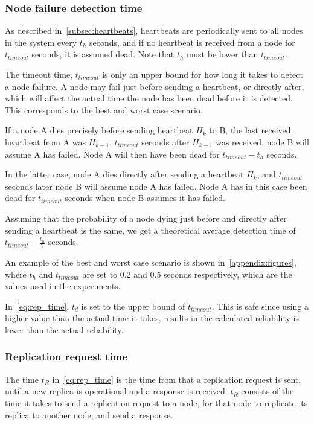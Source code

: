 \documentclass{cslthse-msc}
\begin{document}
\subsubsection{Node failure detection time} \label{sec:node_failure_detection_time}
As described in~\cref{subsec:heartbeats}, heartbeats are periodically sent to all nodes in the system every $t_h$ seconds, and if no heartbeat is received from a node for $t_{timeout}$ seconds, it is assumed dead. Note that $t_h$ must be lower than $t_{timeout}$.

The timeout time, $t_{timeout}$ is only an upper bound for how long it takes to detect a node failure. A node may fail just before sending a heartbeat, or directly after, which will affect the actual time the node has been dead before it is detected. This corresponds to the best and worst case scenario. 

If a node A dies precisely before sending heartbeat $H_k$ to B, the last received heartbeat from A was $H_{k - 1}$. $t_{timeout}$ seconds after $H_{k - 1}$ was received, node B will assume A has failed. Node A will then have been dead for $t_{timeout} - t_h$ seconds.

In the latter case, node A dies directly after sending a heartbeat $H_k$, and $t_{timeout}$ seconds later node B will assume node A has failed. Node A has in this case been dead for $t_{timeout}$ seconds when node B assumes it has failed.

Assuming that the probability of a node dying just before and directly after sending a heartbeat is the same, we get a theoretical average detection time of $t_{timeout} - \frac{t_h}{2}$ seconds. 

An example of the best and worst case scenario is shown in~\cref{appendix:figures}, where $t_h$ and $t_{timeout}$ are set to 0.2 and 0.5 seconds respectively, which are the values used in the experiments.

In~\cref{eq:rep_time}, $t_d$ is set to the upper bound of $t_{timeout}$. This is safe since using a higher value than the actual time it takes, results in the calculated reliability is lower than the actual reliability.


\subsubsection{Replication request time} \label{sec:replication_time}
The time $t_R$ in~\cref{eq:rep_time} is the time from that a replication request is sent, until a new replica is operational and a response is received. $t_R$ consists of the time it takes to send a replication request to a node, for that node to replicate its replica to another node, and send a response.
\end{document}
